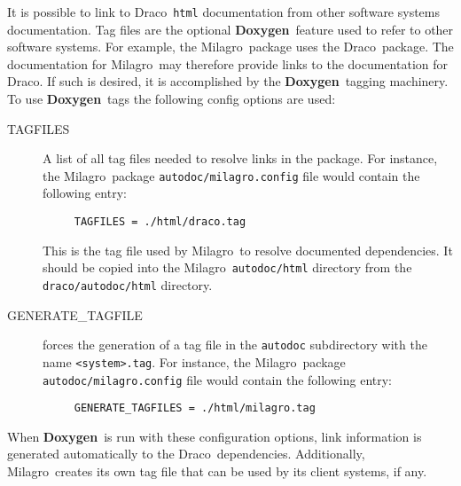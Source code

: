 \documentclass[11pt]{nmemo}
\newcommand{\draco}{{\normalfont\sffamily Draco}}
\newcommand{\milagro}{{\normalfont\sffamily Milagro}}
\newcommand{\doxy}{{\normalfont\bfseries Doxygen}}
\begin{document}
It is possible to link to \draco\ \texttt{html} documentation from other
software systems documentation.
Tag files are the  optional \doxy\ feature used to refer to other software systems. 
For example, the \milagro\
package uses the \draco\ package.  The documentation for \milagro\
may therefore provide links to the documentation for \draco.  If such is 
desired, it is  accomplished
by the \doxy\ tagging machinery.  To use \doxy\ tags the following
config options are used:
\begin{description}

\item[\ttfamily TAGFILES] A list of all tag files needed to resolve
  links in the package.  For instance, the \milagro\ package
  \texttt{autodoc/milagro.config} file would contain the following entry:
\begin{verbatim}
     TAGFILES = ./html/draco.tag
\end{verbatim}
  This is  the tag file used by \milagro\ to resolve documented
  dependencies. It should be copied into the \milagro\ \texttt{autodoc/html}
  directory from the \texttt{draco/autodoc/html} directory.

\item[\ttfamily GENERATE\_TAGFILE] forces the generation of
  a tag file in the \texttt{autodoc} subdirectory with the name 
  \texttt{<system>.tag}.
For instance, the \milagro\ package
  \texttt{autodoc/milagro.config} file would contain the following entry:
\begin{verbatim}
     GENERATE_TAGFILES = ./html/milagro.tag
\end{verbatim}

\end{description}
When \doxy\ is run with these configuration options, link information
is generated automatically to the \draco\ dependencies.  Additionally, 
\milagro\ creates its own tag file that can be used by its client
systems, if any.
\end{document}
